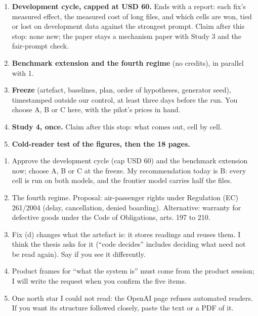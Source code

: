 \documentclass[10pt]{article}
\newcommand{\sect}[1]{\needspace{5\baselineskip}\vspace{3pt}{\bfseries #1\par}\vspace{1pt}}
\begin{document}
{\sect{6. Order, and what the paper can claim at each stop}
\begin{enumerate}
\item \textbf{Development cycle, capped at USD 60.} Ends with a report: each fix's measured effect, the measured cost of long files, and which cells are won, tied or lost on development data against the strongest prompt. Claim after this stop: none new; the paper stays a mechanism paper with Study 3 and the fair-prompt check.
\item \textbf{Benchmark extension and the fourth regime} (no credits), in parallel with 1.
\item \textbf{Freeze} (artefact, baselines, plan, order of hypotheses, generator seed), timestamped outside our control, at least three days before the run. You choose A, B or C here, with the pilot's prices in hand.
\item \textbf{Study 4, once.} Claim after this stop: what comes out, cell by cell.
\item \textbf{Cold-reader test of the figures, then the 18 pages.}
\end{enumerate}
\sect{7. Decisions I need}
\begin{enumerate}
\item Approve the development cycle (cap USD 60) and the benchmark extension now; choose A, B or C at the freeze. My recommendation today is B: every cell is run on both models, and the frontier model carries half the files.
\item The fourth regime. Proposal: air-passenger rights under Regulation (EC) 261/2004 (delay, cancellation, denied boarding). Alternative: warranty for defective goods under the Code of Obligations, arts. 197 to 210.
\item Fix (d) changes what the artefact is: it stores readings and reuses them. I think the thesis asks for it (“code decides” includes deciding what need not be read again). Say if you see it differently.
\item Product frames for “what the system is” must come from the product session; I will write the request when you confirm the five items.
\item One north star I could not read: the OpenAI page refuses automated readers. If you want its structure followed closely, paste the text or a PDF of it.
\end{enumerate}
}
\end{document}
